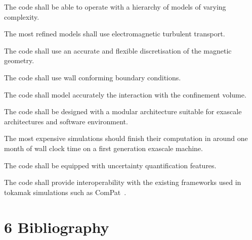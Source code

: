 \documentclass{article}
\begin{document}
\item The code shall be able to operate with a hierarchy of models of varying complexity.

\item The most refined models shall use electromagnetic turbulent transport.

\item The code shall use an accurate and flexible discretisation of the magnetic geometry.

\item The code shall use wall conforming boundary conditions.  

\item The code shall model accurately the interaction with the confinement volume.

\item The code shall be designed with a modular architecture suitable for exascale 
architectures and software environment.

\item The most expensive simulations should finish their computation in around one 
month of wall clock time on a first generation exascale machine.

\item The code shall be equipped with uncertainty quantification features.

\item The code shall provide interoperability with the existing frameworks used in 
tokamak simulations such as ComPat~\cite{ref [23]}.\pagebreak{}

\section*{6 {\Large{}{ \textbf{Bibliography}}}}
\end{document}
